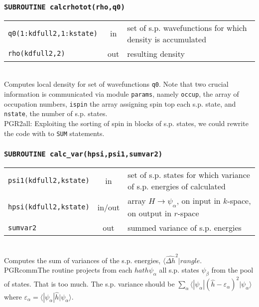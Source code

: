 \documentclass[final,1p]{elsarticle}
\newcommand{\PGRcomm}[1]{{\color{blue}\small PGR2all: #1}}
\begin{document}
\subsubsection*{\tt SUBROUTINE calcrhotot(rho,q0)}
\begin{tabular}{lcl}
 {\tt q0(1:kdfull2,1:kstate) } & in & set of s.p. wavefunctions for
 which density is accumulated\\
 {\tt rho(kdfull2,2)} & out & resulting density\\
\end{tabular}
\\[4pt]
Computes local density for set of wavefunctions {\tt q0}. Note that
two crucial information is communicated via module {\tt params}, namely
{\tt occup}, the array of occupation numbers, {\tt ispin} the
array assigning spin top each s.p. state, and {\tt nstate}, the number
of s.p. states.
\\
\PGRcomm{Exploiting the sorting of spin in blocks of s.p. states, we
  could rewrite the code with to {\tt SUM} statements.}


\subsubsection*{\tt SUBROUTINE calc\_var(hpsi,psi1,sumvar2)}
\begin{tabular}{lcl}
 {\tt psi1(kdfull2,kstate)}& in & set of s.p. states for which
 variance of s.p. energies of calculated\\
 {\tt hpsi(kdfull2,kstate)} & in/out & array
 $H\rightarrow\psi_\alpha$, on input in $k$-space, on output in $r$-space
\\
 {\tt sumvar2} & out  & summed variance of s.p. energies\\
\end{tabular}
\\[4pt]
Computes the sum of variances of the s.p. energies,
$\langle\hat{\Delta h}^2|rangle$. 
\\
PGRcomm{The routine projects from each $hat{h}\psi_\alpha$
all s.p. states $\psi_\beta$ from the pool of states. That is too
much. The s.p. variance should be
$\sum_\alpha\langle|\psi_\alpha|(\hat{h}-\varepsilon_\alpha)^2|\psi_\alpha\rangle$
where $\varepsilon_\alpha=\langle|\psi_\alpha|\hat{h}|\psi_\alpha\rangle$.}
\end{document}
